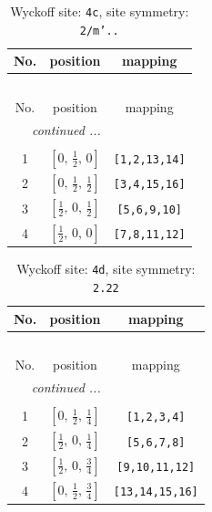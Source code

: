 \documentclass[fleqn,8pt]{jsarticle}
\begin{document}
\renewcommand{\arraystretch}{1.2}
\begin{longtable}{ccc}
\caption{Wyckoff site: {\tt 4c}, site symmetry: {\tt 2/m'..}}
 \\
 \hline \hline
No. & position & mapping \\ \hline \endfirsthead

\multicolumn{2}{l}{\tablename\ \thetable{}} \\
 \hline \hline
No. & position & mapping \\ \hline \endhead

 \hline \hline
\multicolumn{2}{r}{\footnotesize\it continued ...} \\ \endfoot

 \hline \hline
\multicolumn{2}{r}{} \\ \endlastfoot

1 & $\left[ 0,\, \frac{1}{2},\, 0 \right]$ & {\tt [1,2,13,14]} \\ \hline
2 & $\left[ 0,\, \frac{1}{2},\, \frac{1}{2} \right]$ & {\tt [3,4,15,16]} \\ \hline
3 & $\left[ \frac{1}{2},\, 0,\, \frac{1}{2} \right]$ & {\tt [5,6,9,10]} \\ \hline
4 & $\left[ \frac{1}{2},\, 0,\, 0 \right]$ & {\tt [7,8,11,12]} \\
\end{longtable}
\renewcommand{\arraystretch}{1.2}
\begin{longtable}{ccc}
\caption{Wyckoff site: {\tt 4d}, site symmetry: {\tt 2.22}}
 \\
 \hline \hline
No. & position & mapping \\ \hline \endfirsthead

\multicolumn{2}{l}{\tablename\ \thetable{}} \\
 \hline \hline
No. & position & mapping \\ \hline \endhead

 \hline \hline
\multicolumn{2}{r}{\footnotesize\it continued ...} \\ \endfoot

 \hline \hline
\multicolumn{2}{r}{} \\ \endlastfoot

1 & $\left[ 0,\, \frac{1}{2},\, \frac{1}{4} \right]$ & {\tt [1,2,3,4]} \\ \hline
2 & $\left[ \frac{1}{2},\, 0,\, \frac{1}{4} \right]$ & {\tt [5,6,7,8]} \\ \hline
3 & $\left[ \frac{1}{2},\, 0,\, \frac{3}{4} \right]$ & {\tt [9,10,11,12]} \\ \hline
4 & $\left[ 0,\, \frac{1}{2},\, \frac{3}{4} \right]$ & {\tt [13,14,15,16]} \\
\end{longtable}
\end{document}
